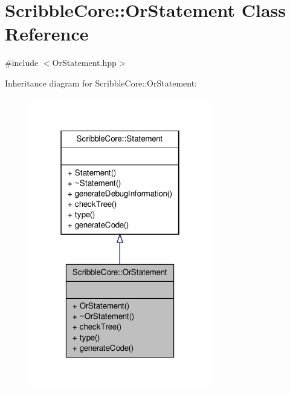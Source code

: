 \hypertarget{class_scribble_core_1_1_or_statement}{\section{Scribble\-Core\-:\-:Or\-Statement Class Reference}
\label{class_scribble_core_1_1_or_statement}
}


{\ttfamily \#include $<$Or\-Statement.\-hpp$>$}



Inheritance diagram for Scribble\-Core\-:\-:Or\-Statement\-:
\nopagebreak
\begin{figure}[H]
\begin{center}
\leavevmode
\includegraphics[width=226pt]{class_scribble_core_1_1_or_statement__inherit__graph}
\end{center}
\end{figure}


